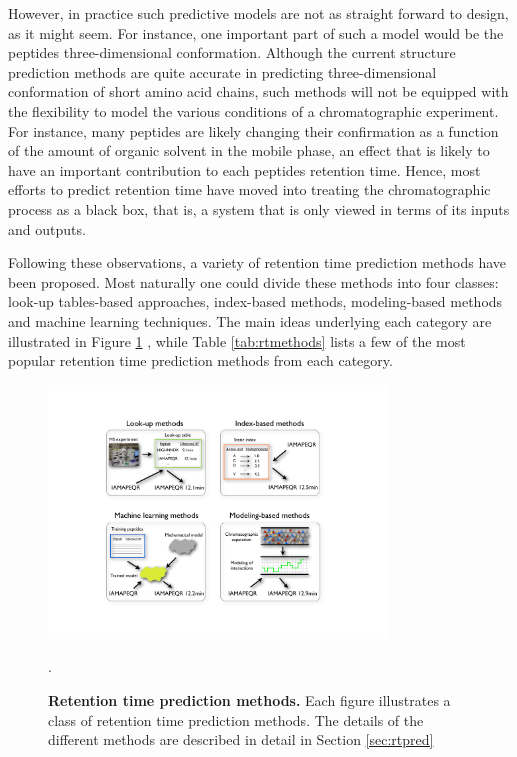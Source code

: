 \documentclass[a4paper]{article}
\begin{document}
However, in practice such predictive models are not as straight
forward to design, as it might seem. For instance, one important part
of such a model would be the peptides three-dimensional
conformation. Although the current structure prediction methods are
quite accurate in predicting three-dimensional conformation of short
amino acid chains, such methods will not be equipped with the
flexibility to model the various conditions of a chromatographic
experiment. For instance, many peptides are likely changing their
confirmation as a function of the amount of organic solvent in the
mobile phase, an effect that is likely to have an important
contribution to each peptides retention time. Hence, most efforts to
predict retention time have moved into treating the chromatographic
process as a black box, that is, a system that is only viewed in terms
of its inputs and outputs.
 
  
Following these observations, a variety of retention time prediction
methods have been proposed. Most naturally one could divide these
methods into four classes: look-up tables-based approaches,
index-based methods, modeling-based methods and machine learning
techniques. The main ideas underlying each category are illustrated in
Figure \ref{fig:methods} , while Table \ref{tab:rtmethods} lists a few
of the most popular retention time prediction methods from each
category.

\begin{figure}[p]
\centering \includegraphics[clip=true,
  width=0.8\textwidth]{img/methods.pdf}
\caption{\label{fig:methods} {\bf Retention time prediction methods.}
  Each figure illustrates a class of retention time prediction
  methods. The details of the different methods are described in
  detail in Section \ref{sec:rtpred}}.
\vspace{-7pt}
\end{figure}
\end{document}
